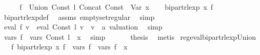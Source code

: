 \begin{isabellebody}
%
\endisadelimproof
%
\isatagproof
{}\isamarkupfalse%
\ {\isacharminus}{\kern0pt}\isanewline
\ \ \isamarkupfalse%
\ {\isacharquery}{\kern0pt}f{\isacharprime}{\kern0pt}\ {\isacharequal}{\kern0pt}\ {\isachardoublequoteopen}Union\ {\isacharparenleft}{\kern0pt}Const\ l{\isacharparenright}{\kern0pt}\ {\isacharparenleft}{\kern0pt}Concat\ {\isacharparenleft}{\kern0pt}Const\ {\isacharbraceleft}{\kern0pt}{\isacharbraceright}{\kern0pt}{\isacharparenright}{\kern0pt}\ {\isacharparenleft}{\kern0pt}Var\ x{\isacharparenright}{\kern0pt}{\isacharparenright}{\kern0pt}{\isachardoublequoteclose}\isanewline
\ \ \isamarkupfalse%
\ {\isachardoublequoteopen}bipart{\isacharunderscore}{\kern0pt}rlexp\ x\ {\isacharquery}{\kern0pt}f{\isacharprime}{\kern0pt}{\isachardoublequoteclose}\isanewline
\ \ \ \ \isamarkupfalse%
\ bipart{\isacharunderscore}{\kern0pt}rlexp{\isacharunderscore}{\kern0pt}def\ \isamarkupfalse%
\ assms\ emptyset{\isacharunderscore}{\kern0pt}regular\ \isamarkupfalse%
\ simp\isanewline
\ \ \isamarkupfalse%
\ \isamarkupfalse%
\ {\isachardoublequoteopen}eval\ {\isacharquery}{\kern0pt}f{\isacharprime}{\kern0pt}\ v\ {\isacharequal}{\kern0pt}\ eval\ {\isacharparenleft}{\kern0pt}Const\ l{\isacharparenright}{\kern0pt}\ v{\isachardoublequoteclose}\ \ v\ {\isacharcolon}{\kern0pt}{\isacharcolon}{\kern0pt}\ {\isachardoublequoteopen}{\isacharprime}{\kern0pt}a\ valuation{\isachardoublequoteclose}\ \isamarkupfalse%
\ simp\isanewline
\ \ \isamarkupfalse%
\ \isamarkupfalse%
\ {\isachardoublequoteopen}vars\ {\isacharquery}{\kern0pt}f{\isacharprime}{\kern0pt}\ {\isacharequal}{\kern0pt}\ vars\ {\isacharparenleft}{\kern0pt}Const\ l{\isacharparenright}{\kern0pt}\ {\isasymunion}\ {\isacharbraceleft}{\kern0pt}x{\isacharbraceright}{\kern0pt}{\isachardoublequoteclose}\ \isamarkupfalse%
\ simp\ \isanewline
\ \ \isamarkupfalse%
\ \isamarkupfalse%
\ {\isacharquery}{\kern0pt}thesis\ \isamarkupfalse%
\ metis\isanewline
{}\isamarkupfalse%
%
\endisatagproof
{\isafoldproof}%
%
\isadelimproof
\isanewline
%
\endisadelimproof
\isanewline
{}\isamarkupfalse%
\ reg{\isacharunderscore}{\kern0pt}eval{\isacharunderscore}{\kern0pt}bipart{\isacharunderscore}{\kern0pt}rlexp{\isacharunderscore}{\kern0pt}Union{\isacharcolon}{\kern0pt}\isanewline
\ \ \ {\isachardoublequoteopen}{\isasymexists}f{\isacharprime}{\kern0pt}{\isachardot}{\kern0pt}\ bipart{\isacharunderscore}{\kern0pt}rlexp\ x\ f{\isacharprime}{\kern0pt}\ {\isasymand}\ vars\ f{\isacharprime}{\kern0pt}\ {\isacharequal}{\kern0pt}\ vars\ f{}\ {\isasymunion}\ {\isacharbraceleft}{\kern0pt}x{\isacharbraceright}{\kern0pt}\ {\isasymand}\isanewline

\end{isabellebody}
